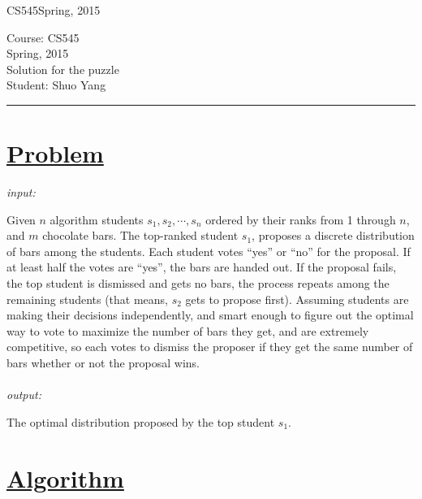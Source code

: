 \documentclass[11pt]{article}
\def\CourseCode{CS545}
\def\DateHandedOut{Spring, 2015}
\def\Author{Shuo Yang}
\begin{document}
\noindent

\CourseCode \hfill \DateHandedOut

\begin{center}
Course: \CourseCode\\
\DateHandedOut\\
Solution for the puzzle\\
Student: \Author\\
\end{center}

\hrule\smallskip

\section*{\underline{Problem}}
\emph{input:}

Given $n$ algorithm students $s_1,s_2,\cdots,s_n$ ordered by their
ranks from 1 through $n$, and 
$m$ chocolate bars. The top-ranked student $s_1$, proposes a discrete
distribution of bars among the students. Each student votes ``yes'' or
``no'' for the proposal. If at least half the votes are ``yes'', the bars
are handed out. If the proposal fails, the top student is dismissed
and gets no bars, the process repeats among the remaining students
(that means, $s_2$ gets to propose first). Assuming students are making
their decisions independently, and smart enough to figure out the
optimal way to vote to maximize the number of bars they get, and are
extremely competitive, so each votes to dismiss the proposer if they
get the same number of bars whether or not the proposal wins.\\\\
\emph{output:}

The optimal distribution proposed by the top student $s_1$.

\section*{\underline{Algorithm}}
\end{document}
